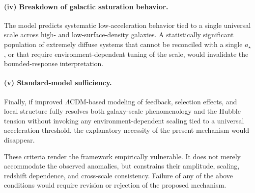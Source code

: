   \paragraph{(iv) Breakdown of galactic saturation behavior.}

    The model predicts systematic low-acceleration behavior tied to
    a single universal scale across high- and low-surface-density
    galaxies.
    A statistically significant population of extremely diffuse
    systems that cannot be reconciled with a single $a_\star$,
    or that require environment-dependent tuning of the scale,
    would invalidate the bounded-response interpretation.

  \paragraph{(v) Standard-model sufficiency.}

    Finally, if improved $\Lambda$CDM-based modeling of feedback,
    selection effects, and local structure fully resolves both
    galaxy-scale phenomenology and the Hubble tension without
    invoking any environment-dependent scaling tied to a universal
    acceleration threshold, the explanatory necessity of the present
    mechanism would disappear.

    These criteria render the framework empirically vulnerable.
    It does not merely accommodate the observed anomalies,
    but constrains their amplitude, scaling, redshift dependence,
    and cross-scale consistency.
    Failure of any of the above conditions would require
    revision or rejection of the proposed mechanism.
